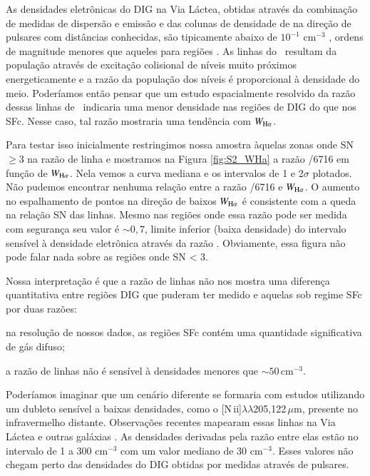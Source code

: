 As densidades eletrônicas do DIG na Via Láctea, obtidas através da combinação de medidas de dispersão e emissão e das colunas de densidade de \hi na direção de pulsares com distâncias conhecidas, são tipicamente abaixo de $10^{-1}$ cm$^{-3}$ \citep{Berk.and.Fletcher.2008}, ordens de magnitude menores que aqueles para regiões \hii.
As linhas do \Sii\ resultam da população através de excitação colisional de níveis muito próximos energeticamente e a razão da população dos níveis  é proporcional à densidade do meio.
Poderíamos então pensar que um estudo espacialmente resolvido da razão dessas linhas de \sii\ indicaria uma menor densidade nas regiões de DIG do que nos SFc. Nesse caso, tal razão mostraria uma tendência com $W_{\Ha}$.

Para testar isso inicialmente restringimos nossa amostra àquelas zonas onde SN $\ge 3$ na razão de linha \sii e mostramos na Figura \ref{fig:S2_WHa} a razão /6716 em função de $W_{\Ha}$. Nela vemos a curva mediana e os intervalos de 1 e 2$\sigma$ plotados. Não pudemos encontrar nenhuma relação entre a razão /6716 e $W_{\Ha}$. O aumento no espalhamento de pontos na direção de baixos $W_{\Ha}$ é consistente com a queda na relação SN das linhas. Mesmo nas regiões onde essa razão pode ser medida com segurança seu valor é $\sim 0,7$, limite inferior (baixa densidade) do intervalo sensível à densidade eletrônica através da razão \sii. Obviamente, essa figura não pode falar nada sobre as regiões onde SN < 3.

Nossa interpretação é que a razão de linhas \sii não nos mostra uma diferença quantitativa entre regiões DIG que puderam ter \sii medido e aquelas sob regime SFc por duas razões:
\begin{enumerate*}[label=(\roman*)]
    \item na resolução de nossos dados, as regiões SFc contém uma quantidade significativa de gás difuso;
    \item a razão de linhas \sii não é sensível à densidades menores que $\sim 50$\,cm$^{-3}$.
\end{enumerate*}

Poderíamos imaginar que um cenário diferente se formaria com estudos utilizando um dubleto sensível a baixas densidades, como o [N\,{\sc ii}]$\lambda\lambda$205,122\,$\mu$m, presente no infravermelho distante. Observações recentes mapearam essas linhas na Via Láctea e outras galáxias \citep{Goldsmith.etal.2015, HerreraCamus.etal.2016}. As densidades derivadas pela razão entre elas estão no intervalo de 1 a 300 cm$^{-3}$ com um valor mediano de 30 cm$^{-3}$. Esses valores não chegam perto das densidades do DIG obtidas por medidas através de pulsares.

